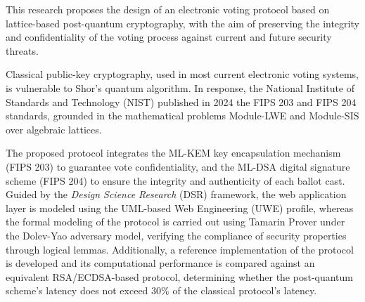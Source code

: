 
This research proposes the design of an electronic voting protocol based on lattice-based post-quantum cryptography, with the aim of preserving the integrity and confidentiality of the voting process against current and future security threats.

Classical public-key cryptography, used in most current electronic voting systems, is vulnerable to Shor's quantum algorithm. In response, the National Institute of Standards and Technology (NIST) published in 2024 the FIPS 203 and FIPS 204 standards, grounded in the mathematical problems Module-LWE and Module-SIS over algebraic lattices.

The proposed protocol integrates the ML-KEM key encapsulation mechanism (FIPS 203) to guarantee vote confidentiality, and the ML-DSA digital signature scheme (FIPS 204) to ensure the integrity and authenticity of each ballot cast. Guided by the \textit{Design Science Research} (DSR) framework, the web application layer is modeled using the UML-based Web Engineering (UWE) profile, whereas the formal modeling of the protocol is carried out using Tamarin Prover under the Dolev-Yao adversary model, verifying the compliance of security properties through logical lemmas. Additionally, a reference implementation of the protocol is developed and its computational performance is compared against an equivalent RSA/ECDSA-based protocol, determining whether the post-quantum scheme's latency does not exceed 30\% of the classical protocol's latency.

\bigskip
